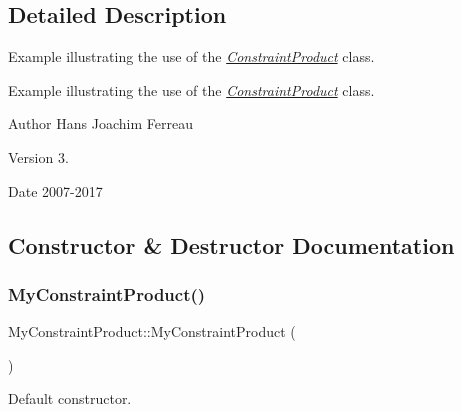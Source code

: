 \subsection{Detailed Description}
Example illustrating the use of the {\itshape \hyperlink{class_constraint_product}{Constraint\+Product}} class. 

Example illustrating the use of the {\itshape \hyperlink{class_constraint_product}{Constraint\+Product}} class.

\begin{DoxyAuthor}{Author}
Hans Joachim Ferreau 
\end{DoxyAuthor}
\begin{DoxyVersion}{Version}
3. 
\end{DoxyVersion}
\begin{DoxyDate}{Date}
2007-\/2017 
\end{DoxyDate}


\subsection{Constructor \& Destructor Documentation}
\mbox{\label{class_my_constraint_product_a670ac34e0d2147f7be90334c51c280b1}} 
\subsubsection{\texorpdfstring{My\+Constraint\+Product()}{MyConstraintProduct()}\hspace{0.1cm}{\footnotesize\ttfamily [1/3]}}
{\footnotesize\ttfamily My\+Constraint\+Product\+::\+My\+Constraint\+Product (\begin{DoxyParamCaption}{ }\end{DoxyParamCaption})\hspace{0.3cm}{\ttfamily [inline]}}

Default constructor. \mbox{\label{class_my_constraint_product_aa59ae2fb906bae0074fdcf1b2b7e61c0}} 
